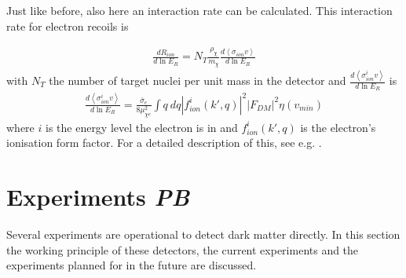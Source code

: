 \documentclass{article}
\begin{document}
Just like before, also here an interaction rate can be calculated. This interaction rate for electron recoils is

\begin{align}
    \frac{dR_{ion}}{d\ln E_R} = N_T \frac{\rho_\chi}{m_\chi} \frac{d\left<\sigma_{ion}v\right>}{d\ln E_R}
\end{align}
with $N_T$ the number of target nuclei per unit mass in the detector and $\frac{d\left<\sigma_{ion}^iv\right>}{d\ln E_R}$ is
\begin{align}
    \frac{d\left<\sigma_{ion}^iv\right>}{d\ln E_R} = \frac{\bar{\sigma}_e}{8\mu^2_{\chi e}}\int q\ dq \left| f_{ion}^i(k',q) \right|^2 \left|F_{DM}\right|^2 \eta (v_{min})
\end{align}
where $i$ is the energy level the electron is in and $f_{ion}^i(k',q)$ is the electron's ionisation form factor. For a detailed description of this, see e.g. \cite{Essig:2011nj}.
 
\vspace{5cm}






\FloatBarrier
\newpage
\section{Experiments \small{\textit{PB}}}

Several experiments are operational to detect dark matter directly. In this section the working principle of these detectors, the current experiments and the experiments planned for in the future are discussed.
\end{document}

